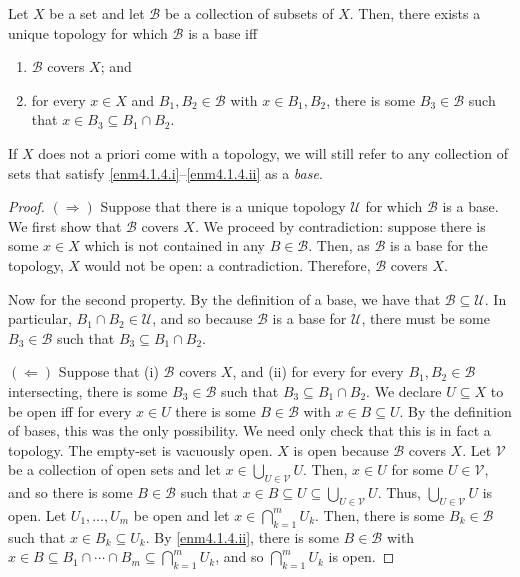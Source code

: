 \begin{prp}\label{prp4.1.5}
Let $X$ be a set and let $\mathcal{B}$ be a collection of subsets of $X$.  Then, there exists a unique topology for which $\mathcal{B}$ is a base iff
\begin{enumerate}
\item \label{enm4.1.4.i}$\mathcal{B}$ covers $X$; and
\item \label{enm4.1.4.ii}for every $x\in X$ and $B_1,B_2\in \mathcal{B}$ with $x\in B_1,B_2$, there is some $B_3\in \mathcal{B}$ such that $x\in B_3\subseteq B_1\cap B_2$.
\end{enumerate}
\begin{rmk}
If $X$ does not a priori come with a topology, we will still refer to any collection of sets that satisfy \ref{enm4.1.4.i}--\ref{enm4.1.4.ii} as a \emph{base}.
\end{rmk}
\begin{proof}
$(\Rightarrow )$ Suppose that there is a unique topology $\mathcal{U}$ for which $\mathcal{B}$ is a base.  We first show that $\mathcal{B}$ covers $X$.  We proceed by contradiction:  suppose there is some $x\in X$ which is not contained in any $B\in \mathcal{B}$.  Then, as $\mathcal{B}$ is a base for the topology, $X$ would not be open:  a contradiction.  Therefore, $\mathcal{B}$ covers $X$.

Now for the second property.  By the definition of a base, we have that $\mathcal{B}\subseteq \mathcal{U}$.  In particular, $B_1\cap B_2\in \mathcal{U}$, and so because $\mathcal{B}$ is a base for $\mathcal{U}$, there must be some $B_3\in \mathcal{B}$ such that $B_3\subseteq B_1\cap B_2$.

\blankline
\noindent
$(\Leftarrow )$ Suppose that (i) $\mathcal{B}$ covers $X$, and (ii) for every for every $B_1,B_2\in \mathcal{B}$ intersecting, there is some $B_3\in \mathcal{B}$ such that $B_3\subseteq B_1\cap B_2$.  We declare $U\subseteq X$ to be open iff for every $x\in U$ there is some $B\in \mathcal{B}$ with $x\in B\subseteq U$.  By the definition of bases, this was the only possibility.  We need only check that this is in fact a topology.  The empty-set is vacuously open.  $X$ is open because $\mathcal{B}$ covers $X$.  Let $\mathcal{V}$ be a collection of open sets and let $x\in \bigcup _{U\in \mathcal{V}}U$.  Then, $x\in U$ for some $U\in \mathcal{V}$, and so there is some $B\in \mathcal{B}$ such that $x\in B\subseteq U\subseteq \bigcup _{U\in \mathcal{V}}U$.  Thus, $\bigcup _{U\in \mathcal{V}}U$ is open.  Let $U_1,\ldots ,U_m$ be open and let $x\in \bigcap _{k=1}^mU_k$.  Then, there is some $B_k\in \mathcal{B}$ such that $x\in B_k\subseteq U_k$.  By \ref{enm4.1.4.ii}, there is some $B\in \mathcal{B}$ with $x\in B\subseteq B_1\cap \cdots \cap B_m\subseteq \bigcap _{k=1}^mU_k$, and so $\bigcap _{k=1}^mU_k$ is open.
\end{proof}
\end{prp}
